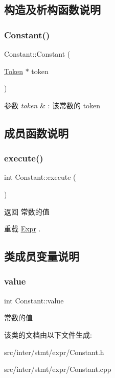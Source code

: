 \subsection{构造及析构函数说明}
\mbox{\label{class_constant_ad227bb35513aab43d86572343a1fe564}} 
\subsubsection{\texorpdfstring{Constant()}{Constant()}}
{\footnotesize\ttfamily Constant\+::\+Constant (\begin{DoxyParamCaption}\item[{\hyperlink{class_token}{Token} $\ast$}]{token }\end{DoxyParamCaption})}


\begin{DoxyParams}{参数}
{\em token} & \+: 该常数的 token \\
\hline
\end{DoxyParams}


\subsection{成员函数说明}
\mbox{\label{class_constant_ab5c55607bcff5ce70131a588b6bdbed7}} 
\subsubsection{\texorpdfstring{execute()}{execute()}}
{\footnotesize\ttfamily int Constant\+::execute (\begin{DoxyParamCaption}{ }\end{DoxyParamCaption})\hspace{0.3cm}{\ttfamily [virtual]}}

\begin{DoxyReturn}{返回}
常数的值 
\end{DoxyReturn}


重载 \hyperlink{class_expr_aff6a2e6eaa460e2a3db28ebdab089b51}{Expr} .



\subsection{类成员变量说明}
\mbox{\label{class_constant_a132c9bc0ec98681bcbf723d87ddd722d}} 
\subsubsection{\texorpdfstring{value}{value}}
{\footnotesize\ttfamily int Constant\+::value}

常数的值 

该类的文档由以下文件生成\+:\begin{DoxyCompactItemize}
\item 
src/inter/stmt/expr/Constant.\+h\item 
src/inter/stmt/expr/Constant.\+cpp\end{DoxyCompactItemize}
